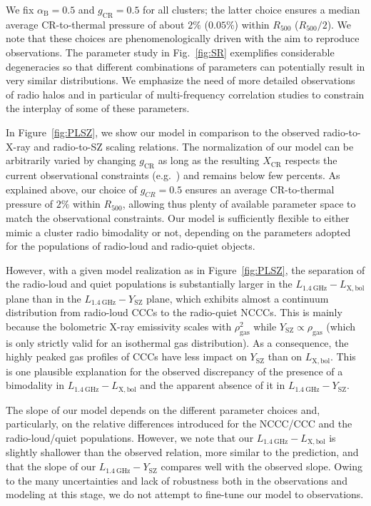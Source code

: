 \documentclass[traditabstract]{aa}
\newcommand{\rmn}{\mathrm}
\begin{document}
We fix $\alpha_{\rmn{B}}=0.5$ and $g_{\rmn{CR}}=0.5$ for all clusters; the
latter choice ensures a median average CR-to-thermal pressure of about $2\%$
($0.05\%$) within $R_{500}$ ($R_{500}/2$). We note that these choices are
phenomenologically driven with the aim to reproduce observations. The parameter
study in Fig.~\ref{fig:SR} exemplifies considerable degeneracies so that
different combinations of parameters can potentially result in very similar
distributions. We emphasize the need of more detailed observations of radio 
halos and in particular of multi-frequency correlation studies to constrain the 
interplay of some of these parameters. 

In Figure~\ref{fig:PLSZ}, we show our model in comparison to the observed
radio-to-X-ray and radio-to-SZ scaling relations. The normalization of our model
can be arbitrarily varied by changing $g_{\rmn{CR}}$ as long as the resulting
$X_{\rmn{CR}}$ respects the current observational constraints
(e.g.~\citealp{2011arXiv1111.5544M}) and remains below few percents. As
explained above, our choice of $g_{CR}=0.5$ ensures an average CR-to-thermal
pressure of $2\%$ within $R_{500}$, allowing thus plenty of available parameter
space to match the observational constraints.  Our model is sufficiently
flexible to either mimic a cluster radio bimodality or not, depending on the
parameters adopted for the populations of radio-loud and radio-quiet
objects. 

However, with a given model realization as in Figure~\ref{fig:PLSZ}, the
separation of the radio-loud and quiet populations is substantially larger in
the $L_{1.4~\rmn{GHz}}-L_{\rmn{X,bol}}$ plane than in the
$L_{1.4~\rmn{GHz}}-Y_{\rmn{SZ}}$ plane, which exhibits almost a continuum
distribution from radio-loud CCCs to the radio-quiet NCCCs. This is mainly
because the bolometric X-ray emissivity scales with $\rho_{\rmn{gas}}^2$ while
$Y_{\rmn{SZ}}\propto\rho_{\rmn{gas}}$ (which is only strictly valid for an
isothermal gas distribution). As a consequence, the highly peaked gas profiles
of CCCs have less impact on $Y_{\rmn{SZ}}$ than on $L_{\rmn{X,bol}}$. This is
one plausible explanation for the observed discrepancy of the presence of a
bimodality in $L_{1.4~\rmn{GHz}}-L_{\rmn{X,bol}}$ and the apparent absence of it
in $L_{1.4~\rmn{GHz}}-Y_{\rmn{SZ}}$. 

The slope of our model depends on the different parameter choices and,
particularly, on the relative differences introduced for the NCCC/CCC and the
radio-loud/quiet populations. However, we note that our
$L_{1.4~\rmn{GHz}}-L_{\rmn{X,bol}}$ is slightly shallower than the observed
relation, more similar to the \cite{2009JCAP...09..024K} prediction, and that
the slope of our $L_{1.4~\rmn{GHz}}-Y_{\rmn{SZ}}$ compares well with the
observed slope. Owing to the many uncertainties and lack of robustness both in
the observations and modeling at this stage, we do not attempt to fine-tune our
model to observations.
\end{document}
